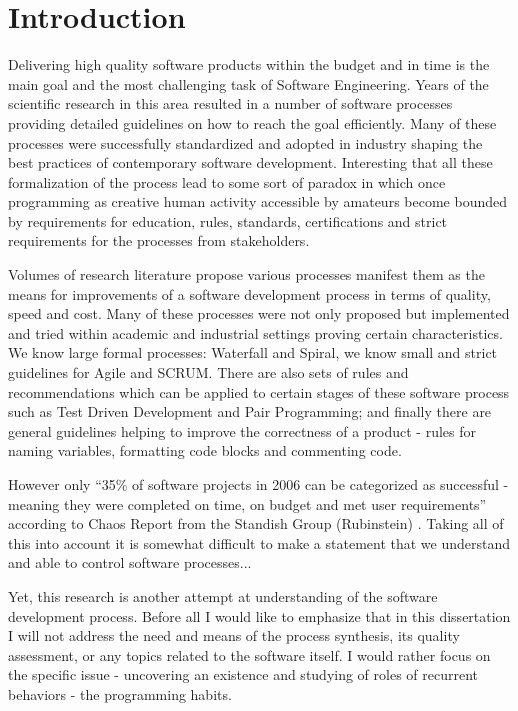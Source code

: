 \chapter{Introduction}
Delivering high quality software products within the budget and in time is the main goal and the most 
challenging task of Software Engineering. Years of the scientific research in
this area resulted in a number of software processes providing detailed guidelines on how to reach 
the goal efficiently. Many of these processes were successfully standardized and adopted 
in industry shaping the best practices of contemporary software development. 
Interesting that all these formalization of the process lead to some sort of paradox in which 
once programming as creative human activity accessible by amateurs become bounded by requirements 
for education, rules, standards, certifications and strict requirements for the processes 
from stakeholders. 

Volumes of research literature propose various processes manifest them as the 
means for improvements of a software development process in terms of quality, speed and cost. 
Many of these processes were not only proposed but implemented and tried within academic 
and industrial settings proving certain characteristics. We know large formal processes: 
Waterfall and Spiral, we know small and strict guidelines for Agile and SCRUM. 
There are also sets of rules and recommendations which can be applied to certain stages of these 
software process such as Test Driven Development and Pair Programming; and finally there are general 
guidelines helping to improve the correctness of a product - rules for naming variables, 
formatting code blocks and commenting code. 


However only ``35\% of software projects in 2006 can be categorized as successful - meaning 
they were completed on time, on budget and met user requirements'' according to Chaos Report
from the Standish Group (Rubinstein) \cite{SDTimes}. Taking all of this into account it is somewhat difficult 
to make a statement that we understand and able to control software processes...

Yet, this research is another attempt at understanding of the software development process. 
Before all I would like to emphasize that in this dissertation I will not address the need and means 
of the process synthesis, its quality assessment, or any topics related to the
software itself. I would rather focus on the specific issue - uncovering an existence 
and studying of roles of recurrent behaviors - the programming habits. 

